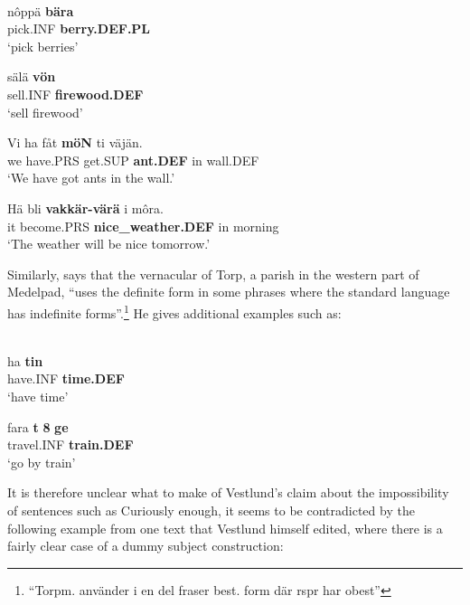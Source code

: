 
\ea\label{}
\\
\gll nôppä  \textbf{bära}\\
pick.INF  \textbf{berry.DEF.PL}\\
\glt ‘pick berries’

\z

\ea
\gll sälä  \textbf{vön} \\
sell.INF  \textbf{firewood.DEF} \\
\glt ‘sell firewood’

\z

\ea
\gll Vi  ha  fåt  \textbf{möN} ti  väjän.  \\
we  have.PRS  get.SUP  \textbf{ant.DEF} in  wall.DEF  \\
\glt ‘We have got ants in the wall.’

\z

\ea
\gll Hä  bli  \textbf{vakkär-värä} i  môra.\\
it  become.PRS  \textbf{nice\_weather.DEF} in  morning\\
\glt ‘The weather will be nice tomorrow.’

\z

Similarly, \citet[140]{Bogren1921} says that the vernacular of Torp, a parish in the western part of Medelpad, “uses the definite form in some phrases where the standard language has indefinite forms”.\footnote{ “Torpm. använder i en del fraser best. form där rspr har obest”} He gives additional examples such as:


\ea\label{}
\\
\gll ha  \textbf{tin} \\
have.INF  \textbf{time.DEF} \\
\glt ‘have time’

\z

\ea
\gll fara  \textbf{t} \textbf{8} \textbf{ge}\\
travel.INF  \textbf{train.DEF}\\
\glt ‘go by train’

\z

It is therefore unclear what to make of Vestlund’s claim about the impossibility of sentences such as Curiously enough, it seems to be contradicted by the following example from one text that Vestlund himself edited, where there is a fairly clear case of a dummy subject construction:

